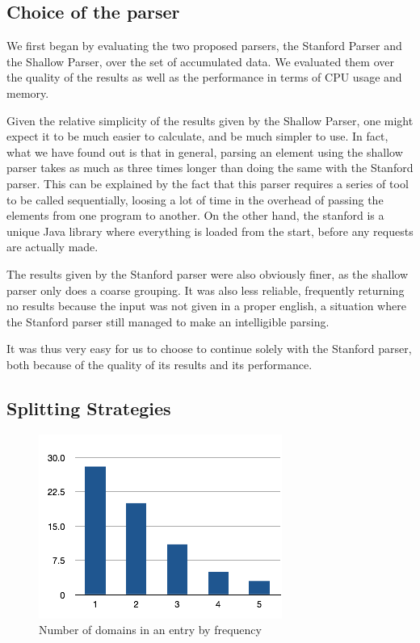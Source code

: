 \subsection{Choice of the parser} %
\label{sub:choice_of_the_parser}

We first began by evaluating the two proposed parsers, the Stanford Parser and the Shallow Parser, over the set of accumulated data. We evaluated them over the quality of the results as well as the performance in terms of CPU usage and memory.

Given the relative simplicity of the results given by the Shallow Parser, one might expect it to be much easier to calculate, and be much simpler to use. In fact, what we have found out is that in general, parsing an element using the shallow parser takes as much as three times longer than doing the same with the Stanford parser. This can be explained by the fact that this parser requires a series of tool to be called sequentially, loosing a lot of time in the overhead of passing the elements from one program to another. On the other hand, the stanford is a unique Java library where everything is loaded from the start, before any requests are actually made.

The results given by the Stanford parser were also obviously finer, as the shallow parser only does a coarse grouping. It was also less reliable, frequently returning no results because the input was not given in a proper english, a situation where the Stanford parser still managed to make an intelligible parsing.

It was thus very easy for us to choose to continue solely with the Stanford parser, both because of the quality of its results and its performance.


\subsection{Splitting Strategies} %
\label{sub:splitting_strategies}

\begin{figure}[ht!]
  \begin{center}
    \includegraphics{images/frequencydomains}
  \end{center}
  \caption{Number of domains in an entry by frequency}\label{fig:frequency_domains}
\end{figure}


